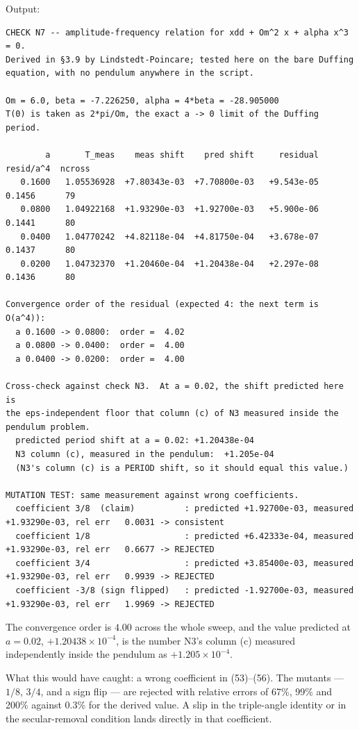 \documentclass[11pt,a4paper]{article}
\begin{document}
Output:

\begin{lstlisting}
CHECK N7 -- amplitude-frequency relation for xdd + Om^2 x + alpha x^3 = 0.
Derived in §3.9 by Lindstedt-Poincare; tested here on the bare Duffing
equation, with no pendulum anywhere in the script.

Om = 6.0, beta = -7.226250, alpha = 4*beta = -28.905000
T(0) is taken as 2*pi/Om, the exact a -> 0 limit of the Duffing period.

        a       T_meas    meas shift    pred shift     residual   resid/a^4  ncross
   0.1600   1.05536928  +7.80343e-03  +7.70800e-03   +9.543e-05      0.1456      79
   0.0800   1.04922168  +1.93290e-03  +1.92700e-03   +5.900e-06      0.1441      80
   0.0400   1.04770242  +4.82118e-04  +4.81750e-04   +3.678e-07      0.1437      80
   0.0200   1.04732370  +1.20460e-04  +1.20438e-04   +2.297e-08      0.1436      80

Convergence order of the residual (expected 4: the next term is O(a^4)):
  a 0.1600 -> 0.0800:  order =  4.02
  a 0.0800 -> 0.0400:  order =  4.00
  a 0.0400 -> 0.0200:  order =  4.00

Cross-check against check N3.  At a = 0.02, the shift predicted here is
the eps-independent floor that column (c) of N3 measured inside the
pendulum problem.
  predicted period shift at a = 0.02: +1.20438e-04
  N3 column (c), measured in the pendulum:  +1.205e-04
  (N3's column (c) is a PERIOD shift, so it should equal this value.)

MUTATION TEST: same measurement against wrong coefficients.
  coefficient 3/8  (claim)          : predicted +1.92700e-03, measured +1.93290e-03, rel err   0.0031 -> consistent
  coefficient 1/8                   : predicted +6.42333e-04, measured +1.93290e-03, rel err   0.6677 -> REJECTED
  coefficient 3/4                   : predicted +3.85400e-03, measured +1.93290e-03, rel err   0.9939 -> REJECTED
  coefficient -3/8 (sign flipped)   : predicted -1.92700e-03, measured +1.93290e-03, rel err   1.9969 -> REJECTED
\end{lstlisting}

The convergence order is \(4.00\) across the whole sweep, and the value predicted
at \(a=0.02\), \(+1.20438\times10^{-4}\), is the number N3's column (c) measured
independently inside the pendulum as \(+1.205\times10^{-4}\).

What this would have caught: a wrong coefficient in (53)--(56). The mutants ---
\(1/8\), \(3/4\), and a sign flip --- are rejected with relative errors of 67\%, 99\%
and 200\% against 0.3\% for the derived value. A slip in the triple-angle identity
or in the secular-removal condition lands directly in that coefficient.
\end{document}

